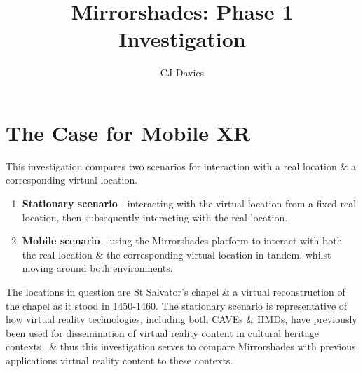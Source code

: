\documentclass[oneside]{book}
\begin{document}
\title{Mirrorshades: Phase 1 Investigation}
\author{CJ Davies}

\maketitle


\chapter{The Case for Mobile XR}
This investigation compares two scenarios for interaction with a real location \& a corresponding virtual location.

\begin{enumerate}
	\item \textbf{Stationary scenario} - interacting with the virtual location from a fixed real location, then subsequently interacting with the real location.
	\item \textbf{Mobile scenario} - using the Mirrorshades platform to interact with both the real location \& the corresponding virtual location in tandem, whilst moving around both environments.
\end{enumerate}

The locations in question are St Salvator's chapel \& a virtual reconstruction of the chapel as it stood in 1450-1460. The stationary scenario is representative of how virtual reality technologies, including both CAVEs \& HMDs, have previously been used for dissemination of virtual reality content in cultural heritage contexts~\cite{Roussou2002} \& thus this investigation serves to compare Mirrorshades with previous applications virtual reality content to these contexts.
\end{document}
